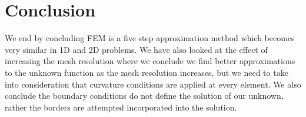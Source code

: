 \section{Conclusion}
We end by concluding FEM is a five step approximation method which becomes very similar in 1D and 2D problems. We have also looked at the effect of increasing the mesh resolution where we conclude we find better approximations to the unknown function as the mesh resolution increases, but we need to take into consideration that curvature conditions are applied at every element. We also conclude the boundary conditions do not define the solution of our unknown, rather the borders are attempted incorporated into the solution.